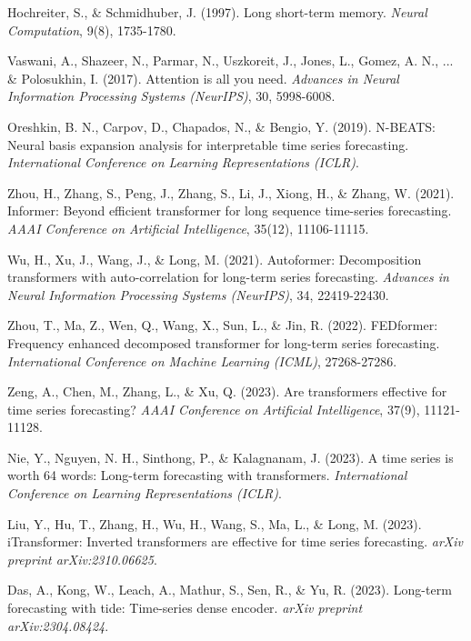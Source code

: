 \documentclass[11pt,a4paper]{article}
\begin{document}
\begin{thebibliography}{99}
Hochreiter, S., \& Schmidhuber, J. (1997).
Long short-term memory.
\textit{Neural Computation}, 9(8), 1735-1780.

Vaswani, A., Shazeer, N., Parmar, N., Uszkoreit, J., Jones, L., Gomez, A. N., ... \& Polosukhin, I. (2017).
Attention is all you need.
\textit{Advances in Neural Information Processing Systems (NeurIPS)}, 30, 5998-6008.

Oreshkin, B. N., Carpov, D., Chapados, N., \& Bengio, Y. (2019).
N-BEATS: Neural basis expansion analysis for interpretable time series forecasting.
\textit{International Conference on Learning Representations (ICLR)}.

Zhou, H., Zhang, S., Peng, J., Zhang, S., Li, J., Xiong, H., \& Zhang, W. (2021).
Informer: Beyond efficient transformer for long sequence time-series forecasting.
\textit{AAAI Conference on Artificial Intelligence}, 35(12), 11106-11115.

Wu, H., Xu, J., Wang, J., \& Long, M. (2021).
Autoformer: Decomposition transformers with auto-correlation for long-term series forecasting.
\textit{Advances in Neural Information Processing Systems (NeurIPS)}, 34, 22419-22430.

Zhou, T., Ma, Z., Wen, Q., Wang, X., Sun, L., \& Jin, R. (2022).
FEDformer: Frequency enhanced decomposed transformer for long-term series forecasting.
\textit{International Conference on Machine Learning (ICML)}, 27268-27286.

Zeng, A., Chen, M., Zhang, L., \& Xu, Q. (2023).
Are transformers effective for time series forecasting?
\textit{AAAI Conference on Artificial Intelligence}, 37(9), 11121-11128.

Nie, Y., Nguyen, N. H., Sinthong, P., \& Kalagnanam, J. (2023).
A time series is worth 64 words: Long-term forecasting with transformers.
\textit{International Conference on Learning Representations (ICLR)}.

Liu, Y., Hu, T., Zhang, H., Wu, H., Wang, S., Ma, L., \& Long, M. (2023).
iTransformer: Inverted transformers are effective for time series forecasting.
\textit{arXiv preprint arXiv:2310.06625}.

Das, A., Kong, W., Leach, A., Mathur, S., Sen, R., \& Yu, R. (2023).
Long-term forecasting with tide: Time-series dense encoder.
\textit{arXiv preprint arXiv:2304.08424}.


\end{thebibliography}
\end{document}
